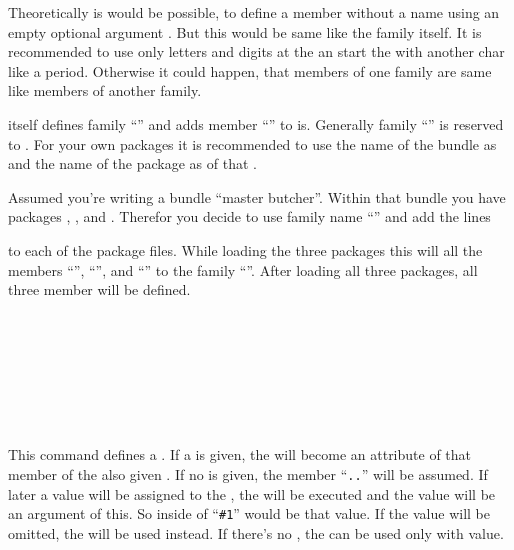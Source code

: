 Theoretically is would be possible, to define a member without a name using an
empty optional argument . But this would be same like the
family itself. It is recommended to use only letters and digits at the
 an start the  with another char like a
period. Otherwise it could happen, that members of one family are same like
members of another family.

 itself defines family ``'' and adds member
``'' to is. Generally family ``'' is
reserved to \KOMAScript{}. For your own packages it is recommended to use the
name of the bundle as  and the name of the package as
 of that .
%
\begin{Example}
  Assumed you're writing a bundle ``master butcher''. Within that bundle you
  have packages , , and
  . Therefor you decide to use family name
  ``'' and add the lines
\begin{lstcode}
\end{lstcode}
  to each of the package files. While loading the three packages this will
  all the members ``'', ``'',
  and ``'' to the family ``''. After
  loading all three packages, all three member will be defined.
\end{Example}
%
%
%


\begin{Declaration}
  \\
  \\
  \\
  \\
  \\
  \\
\end{Declaration}
%
%
%
%
%
%
This command defines a . If a  is given, the
 will become an attribute of that member of the also given
. If no  is given, the member
``\texttt{.}\texttt{.}'' will be assumed. If
later a value will be assigned to the , the  will be
executed and the value will be an argument of this. So inside of
 ``\lstinline{#1}'' would be that value. If the value will be
omitted, the  will be used instead. If there's no
, the  can be used only with value.

